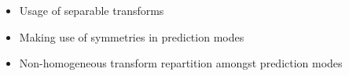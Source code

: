 \documentclass[11pt,a4paper,openright,twoside]{book}
\numberwithin{equation}{section} %
\numberwithin{figure}{section} %
\numberwithin{table}{section} %
\begin{document}
\begin{itemize}
	\item Usage of separable transforms
	\item Making use of symmetries in prediction modes
	\item Non-homogeneous transform repartition amongst prediction modes
\end{itemize}

\backmatter



\label{cha:index}
\printindex
{}
\thispagestyle{empty}
\end{document}
